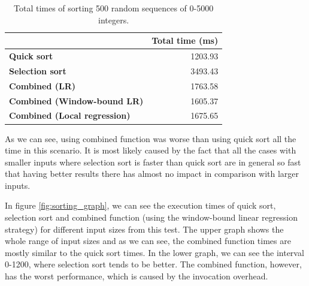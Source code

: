 \begin{table}[h!]
	\captionsetup{justification=centering,margin=0.5cm}
	\bgroup
	\def\arraystretch{1.5}%
	\begin{center}
	\begin{tabular}{|l|r|}
		\hline
		& \multicolumn{1}{c|}{\textbf{Total time (ms)}} \\ \hline
		\textbf{Quick sort}                  & 1203.93                                       \\ \hline
		\textbf{Selection sort}              & 3493.43                                       \\ \hline
		\textbf{Combined (LR)}               & 1763.58                                       \\ \hline
		\textbf{Combined (Window-bound LR)}  & 1605.37                                       \\ \hline
		\textbf{Combined (Local regression)} & 1675.65                                       \\ \hline
	\end{tabular}
\end{center}
\egroup
\caption{Total times of sorting 500 random sequences of 0-5000 integers.}
\label{tab:sorting_results}
\end{table}

As we can see, using combined function was worse than using quick sort all the time in this scenario. It is most likely caused by the fact that all the cases with smaller inputs where selection sort is faster than quick sort are in general so fast that having better results there has almost no impact in comparison with larger inputs.

In figure \ref{fig:sorting_graph}, we can see the execution times of quick sort, selection sort and combined function (using the window-bound linear regression strategy) for different input sizes from this test. The upper graph shows the whole range of input sizes and as we can see, the combined function times are mostly similar to the quick sort times. In the lower graph, we can see the interval 0-1200, where selection sort tends to be better. The combined function, however, has the worst performance, which is caused by the invocation overhead.

